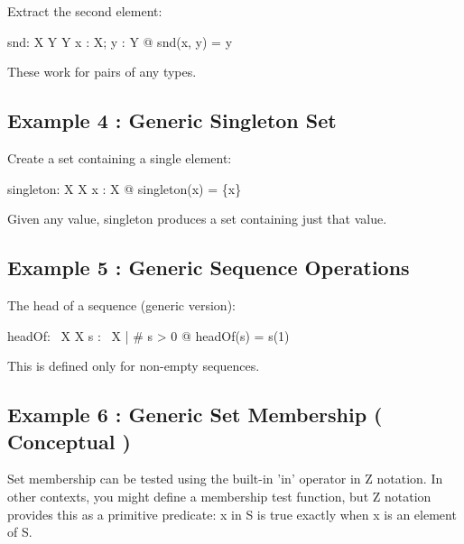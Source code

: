 \documentclass[a4paper,10pt,fleqn]{article}
\begin{document}
\noindent Extract the second element:

\bigskip

\begin{gendef}[X, Y]
  snd: X \cross Y \fun Y
\where
  \forall x : X; y : Y @ snd(x, y) = y
\end{gendef}

\noindent These work for pairs of any types.

\bigskip

\subsection*{Example 4 : Generic Singleton Set}

\noindent Create a set containing a single element:

\bigskip

\begin{gendef}[X]
  singleton: X \fun \power X
\where
  \forall x : X @ singleton(x) = \{x\}
\end{gendef}

\noindent Given any value, singleton produces a set containing just that value.

\bigskip

\subsection*{Example 5 : Generic Sequence Operations}

\noindent The head of a sequence (generic version):

\bigskip

\begin{gendef}[X]
  headOf: \seq~X \fun X
\where
  \forall s : \seq~X | \# s > 0 @ headOf(s) = s(1)
\end{gendef}

\noindent This is defined only for non-empty sequences.

\bigskip

\subsection*{Example 6 : Generic Set Membership ( Conceptual )}

\noindent Set membership can be tested using the built-in 'in' operator in Z notation. In other contexts, you might define a membership test function, but Z notation provides this as a primitive predicate: x in S is true exactly when x is an element of S.
\end{document}

